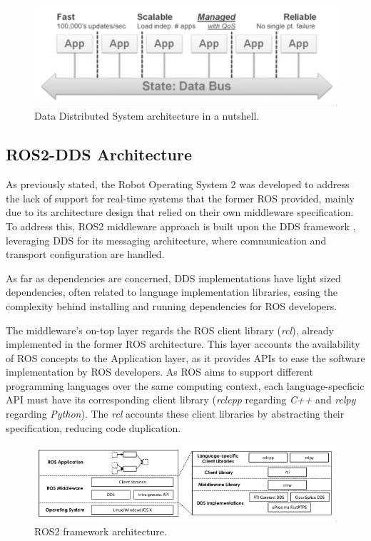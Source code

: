 \begin{figure}[H]
    \centering
    \includegraphics[width=0.6\linewidth]{images/dds-architecture.png}
    \caption{Data Distributed System architecture in a nutshell.}
    \label{fig:dds-architecture-nutshell}
\end{figure}


\subsection{ROS2-DDS Architecture}

As previously stated, the Robot Operating System 2 was developed to address the lack of support for real-time systems that the former ROS provided, mainly due to its architecture design that relied on their own middleware specification. To address this, ROS2 middleware approach is built upon the DDS framework \cite{maruyama2016exploring}, leveraging DDS for its messaging architecture, where communication and transport configuration are handled. 

As far as dependencies are concerned, DDS implementations have light sized dependencies, often related to language implementation libraries, easing the complexity behind installing and running dependencies for ROS developers. \cite{ros-on-dds}

The middleware's on-top layer regards the ROS client library (\textit{rcl}), already implemented in the former ROS architecture. This layer accounts the availability of ROS concepts to the Application layer, as it provides APIs to ease the software implementation by ROS developers. \cite{ros2documentation} As ROS aims to support different programming languages over the same computing context, each language-specficic API must have its corresponding client library (\textit{rclcpp} regarding \textit{C++} and \textit{rclpy} regarding \textit{Python}). The \textit{rcl} accounts these client libraries by abstracting their specification, reducing code duplication.   
\cite{rcl, casini2019response}


\begin{figure}[H]
    \centering
    \includegraphics[width=\linewidth]{images/ros2-architecture.png}
    \caption{ROS2 framework architecture.}
    \label{fig:ros2-architecture}
\end{figure}

